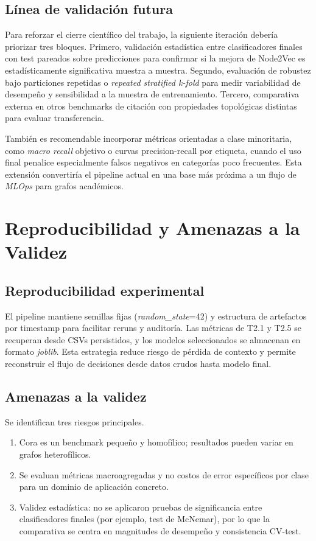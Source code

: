 \documentclass[conference,a4paper]{IEEEtran}
\begin{document}
\subsection{Línea de validación futura}

Para reforzar el cierre científico del trabajo, la siguiente iteración debería priorizar tres bloques.
Primero, validación estadística entre clasificadores finales con test pareados sobre predicciones para
confirmar si la mejora de Node2Vec es estadísticamente significativa muestra a muestra. Segundo,
evaluación de robustez bajo particiones repetidas o \textit{repeated stratified k-fold} para medir
variabilidad de desempeño y sensibilidad a la muestra de entrenamiento. Tercero, comparativa externa en
otros benchmarks de citación con propiedades topológicas distintas para evaluar transferencia.

También es recomendable incorporar métricas orientadas a clase minoritaria, como \textit{macro recall}
objetivo o curvas precision-recall por etiqueta, cuando el uso final penalice especialmente falsos
negativos en categorías poco frecuentes. Esta extensión convertiría el pipeline actual en una base más
próxima a un flujo de \textit{MLOps} para grafos académicos.

\section{\textbf{Reproducibilidad y Amenazas a la Validez}}

\subsection{Reproducibilidad experimental}

El pipeline mantiene semillas fijas (\textit{random\_state}=42) y estructura de artefactos por
timestamp para facilitar reruns y auditoría. Las métricas de T2.1 y T2.5 se recuperan desde CSVs
persistidos, y los modelos seleccionados se almacenan en formato \textit{joblib}. Esta estrategia
reduce riesgo de pérdida de contexto y permite reconstruir el flujo de decisiones desde datos crudos
hasta modelo final.

\subsection{Amenazas a la validez}

Se identifican tres riesgos principales. 
\begin{enumerate}
\item Cora es un benchmark pequeño y homofílico; resultados pueden variar en grafos heterofílicos.
\item Se evaluan métricas macroagregadas y no costos de error específicos por clase para un dominio de aplicación concreto.
\item Validez estadística: no se aplicaron pruebas de significancia entre clasificadores finales (por ejemplo, test de McNemar), por lo que la comparativa se centra en magnitudes de desempeño y consistencia CV-test.
\end{enumerate}
\end{document}
